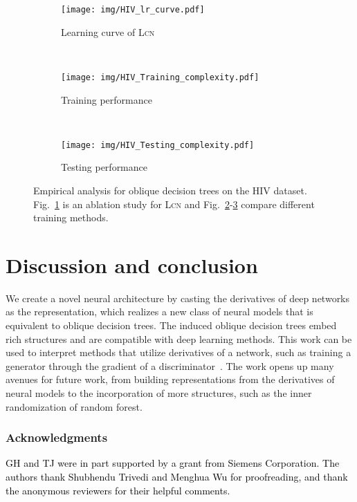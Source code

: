 \documentclass{article} \usepackage{iclr2020_conference,times}
\newcommand{\camera}[1]{\textcolor{black}{#1}}
\begin{document}
\begin{figure}
\centering
	\captionsetup[subfigure]{aboveskip=-0pt,belowskip=-0pt}
    \begin{subfigure}{.32\textwidth}
		\centering
\texttt{[image: img/HIV\_lr\_curve.pdf]}
		\caption{\small Learning curve of \textsc{Lcn}}\label{fig:analysis:lcn}
	\end{subfigure}
    ~
    \begin{subfigure}{.32\textwidth}
		\centering
		\texttt{[image: img/HIV\_Training\_complexity.pdf]}
		\caption{\small Training performance}\label{fig:analysis:train}
	\end{subfigure}
    ~
    \begin{subfigure}{.32\textwidth}
		\centering
		\texttt{[image: img/HIV\_Testing\_complexity.pdf]}
		\caption{\small Testing performance}\label{fig:analysis:test}
	\end{subfigure}
	\caption{Empirical analysis for oblique decision trees on the HIV dataset. Fig.~\ref{fig:analysis:lcn} is an ablation study for \textsc{Lcn} and  Fig.~\ref{fig:analysis:train}-\ref{fig:analysis:test} compare different training methods.}\label{fig:analysis:all}
\end{figure} \section{Discussion and conclusion}
We create a novel neural architecture by casting the derivatives of deep networks as the representation, which realizes a new class of neural models that is equivalent to oblique decision trees. The induced oblique decision trees embed rich structures and are compatible with deep learning methods. This work can be used to interpret methods that utilize derivatives of a network, such as training a generator through the gradient of a discriminator~\citep{goodfellow2014generative}. The work opens up many avenues for future work, from building representations from the derivatives of neural models to the incorporation of more structures, such as the inner randomization of random forest. 

\subsubsection*{Acknowledgments}
\camera{GH and TJ were in part supported by a grant from Siemens Corporation. The authors thank Shubhendu Trivedi and Menghua Wu for proofreading, and thank the anonymous reviewers for their helpful comments.}
\end{document}
